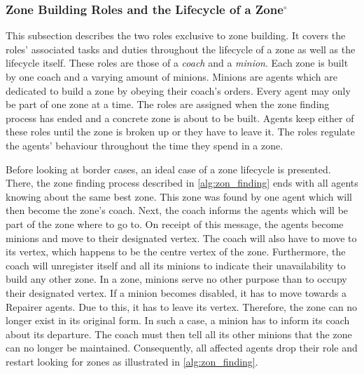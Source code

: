 \subsubsection[Zone Building Roles and the Lifecycle of a Zone]{Zone Building Roles and the Lifecycle of a Zone$^\circ$}\label{alg:zon_roles}
This subsection describes the two roles exclusive to zone building.
It covers the roles' associated tasks and duties throughout the lifecycle of a zone as well as the lifecycle itself.
These roles are those of a \emph{coach} and a \emph{minion}.
Each zone is built by one coach and a varying amount of minions.
Minions are agents which are dedicated to build a zone by obeying their coach's orders.
Every agent may only be part of one zone at a time.
The roles are assigned when the zone finding process has ended and a concrete zone is about to be built.
Agents keep either of these roles until the zone is broken up or they have to leave it.
The roles regulate the agents' behaviour throughout the time they spend in a zone.

Before looking at border cases, an ideal case of a zone lifecycle is presented.
There, the zone finding process described in \autoref{alg:zon_finding} ends with all agents knowing about the same best zone.
This zone was found by one agent which will then become the zone's coach.
Next, the coach informs the agents which will be part of the zone where to go to.
On receipt of this message, the agents become minions and move to their designated vertex.
The coach will also have to move to its vertex, which happens to be the centre vertex of the zone.
Furthermore, the coach will unregister itself and all its minions to indicate their unavailability to build any other zone.
In a zone, minions serve no other purpose than to occupy their designated vertex.
If a minion becomes disabled, it has to move towards a Repairer agents.
Due to this, it has to leave its vertex.
Therefore, the zone can no longer exist in its original form.
In such a case, a minion has to inform its coach about its departure.
The coach must then tell all its other minions that the zone can no longer be maintained.
Consequently, all affected agents drop their role and restart looking for zones as illustrated in \autoref{alg:zon_finding}.

